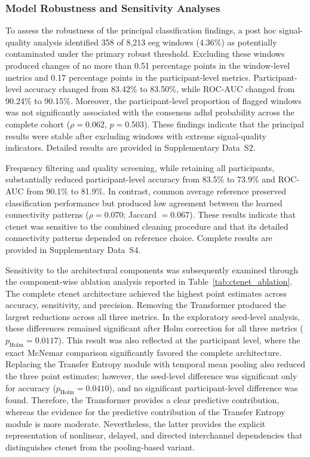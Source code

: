 \subsubsection{Model Robustness and Sensitivity Analyses}
\label{subsec:model_robustness_sensitivity}

{To assess the robustness of the principal classification findings, a
post hoc signal-quality analysis identified 358 of 8,213 \gls{eeg} windows (4.36\%) as potentially contaminated under the primary robust threshold. Excluding these windows produced changes of no more than 0.51 percentage points in the window-level metrics and 0.17 percentage points in the participant-level metrics. Participant-level accuracy changed from 83.42\% to 83.50\%, while ROC-AUC changed from 90.24\% to 90.15\%. Moreover, the participant-level proportion of flagged windows was not significantly associated with the consensus \gls{adhd} probability across the complete cohort
($\rho=0.062$, $p=0.503$). These findings indicate that the principal results were stable after excluding windows with extreme signal-quality indicators. Detailed results are provided in Supplementary Data~S2.}

{Frequency filtering and quality screening, while retaining all participants, substantially reduced participant-level accuracy from 83.5\% to 73.9\% and ROC-AUC from 90.1\% to 81.9\%. In contrast, common average reference preserved classification performance but produced low agreement between the learned connectivity patterns ($\rho=0.070$; Jaccard $= 0.067$). These results indicate that \gls{ctenet} was sensitive to the combined cleaning procedure and that its detailed connectivity patterns depended on reference choice. Complete results are provided in Supplementary Data~S4.}

{Sensitivity to the architectural components was subsequently examined
through the component-wise ablation analysis reported in
Table~\ref{tab:ctenet_ablation}. The complete \gls{ctenet} architecture achieved
the highest point estimates across accuracy, sensitivity, and precision. Removing the Transformer produced the largest reductions across all three metrics. In the exploratory seed-level analysis, these differences remained significant after Holm correction for all three metrics ($p_{\mathrm{Holm}}=0.0117$). This result was also reflected at the participant level, where the exact McNemar comparison significantly favored the complete architecture. Replacing the Transfer Entropy module with temporal mean pooling also reduced the three point estimates; however, the seed-level difference was significant only for accuracy ($p_{\mathrm{Holm}}=0.0410$), and no significant participant-level difference was found. Therefore, the Transformer provides a clear predictive contribution, whereas the evidence for the predictive contribution of the Transfer Entropy module is more moderate. Nevertheless, the latter provides the explicit representation of nonlinear, delayed, and directed interchannel dependencies that distinguishes \gls{ctenet} from the pooling-based variant.}

